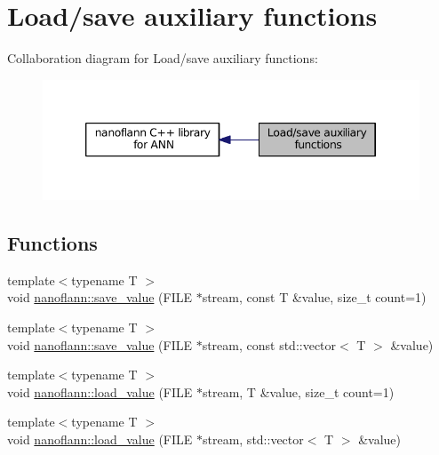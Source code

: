 \hypertarget{group__loadsave__grp}{\section{Load/save auxiliary functions}
\label{group__loadsave__grp}
}
Collaboration diagram for Load/save auxiliary functions\-:
\nopagebreak
\begin{figure}[H]
\begin{center}
\leavevmode
\includegraphics[width=346pt]{group__loadsave__grp}
\end{center}
\end{figure}
\subsection*{Functions}
\begin{DoxyCompactItemize}
\item 
{\footnotesize template$<$typename T $>$ }\\void \hyperlink{group__loadsave__grp_gadf909159ea32f125f71328d00ac2de8d}{nanoflann\-::save\-\_\-value} (F\-I\-L\-E $\ast$stream, const T \&value, size\-\_\-t count=1)
\item 
{\footnotesize template$<$typename T $>$ }\\void \hyperlink{group__loadsave__grp_gac767ee9c25febe0cd6af3ac2e186ffe7}{nanoflann\-::save\-\_\-value} (F\-I\-L\-E $\ast$stream, const std\-::vector$<$ T $>$ \&value)
\item 
{\footnotesize template$<$typename T $>$ }\\void \hyperlink{group__loadsave__grp_ga81940cd63b9ae619251d612d0ddbc819}{nanoflann\-::load\-\_\-value} (F\-I\-L\-E $\ast$stream, T \&value, size\-\_\-t count=1)
\item 
{\footnotesize template$<$typename T $>$ }\\void \hyperlink{group__loadsave__grp_gaefed46e8576d6ce3f1796bb13387ad3d}{nanoflann\-::load\-\_\-value} (F\-I\-L\-E $\ast$stream, std\-::vector$<$ T $>$ \&value)
\end{DoxyCompactItemize}


